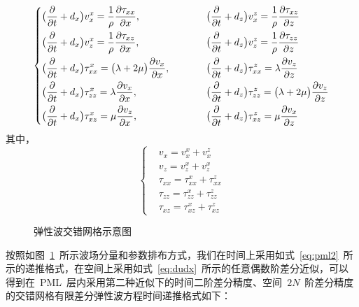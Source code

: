 \documentclass[UTF8]{ctexart}
\begin{document}
\begin{equation}
\left\{ \begin{aligned}
& \big(\frac{\partial}{\partial t}+d_x\big)v_x^x=\frac{1}{\rho}\frac{\partial \tau_{xx}}{\partial x}, & \hspace{10mm} & \big(\frac{\partial}{\partial t}+d_z\big)v_x^z=\frac{1}{\rho}\frac{\partial \tau_{xz}}{\partial z} \\
& \big(\frac{\partial}{\partial t}+d_x\big)v_z^x=\frac{1}{\rho}\frac{\partial \tau_{xz}}{\partial x}, & \hspace{10mm} & \big(\frac{\partial}{\partial t}+d_z\big)v_z^z=\frac{1}{\rho}\frac{\partial \tau_{zz}}{\partial z} \\
& \big(\frac{\partial}{\partial t}+d_x\big)\tau_{xx}^x=\big(\lambda+2\mu\big)\frac{\partial v_x}{\partial x}, & \hspace{10mm} & \big(\frac{\partial}{\partial t}+d_z\big)\tau_{xx}^z=\lambda\frac{\partial v_z}{\partial z} \\
& \big(\frac{\partial}{\partial t}+d_x\big)\tau_{zz}^x=\lambda\frac{\partial v_x}{\partial x}, & \hspace{10mm} & \big(\frac{\partial}{\partial t}+d_z\big)\tau_{zz}^z=\big(\lambda+2\mu\big)\frac{\partial v_z}{\partial z} \\
& \big(\frac{\partial}{\partial t}+d_x\big)\tau_{xz}^x=\mu\frac{\partial v_z}{\partial x}, & \hspace{10mm} & \big(\frac{\partial}{\partial t}+d_z\big)\tau_{xz}^z=\mu\frac{\partial v_x}{\partial z}
\end{aligned} \right.
\end{equation}
其中，
\begin{equation}\label{eq:vt+}
\left\{ \begin{aligned}
& v_x=v_x^x+v_x^z \\
& v_z=v_z^x+v_z^x \\
& \tau_{xx}=\tau_{xx}^x+\tau_{xx}^z \\
& \tau_{zz}=\tau_{zz}^x+\tau_{zz}^z \\
& \tau_{xz}=\tau_{xz}^x+\tau_{xz}^z
\end{aligned} \right.
\end{equation}\par
\begin{figure}[t]
  \centering
  
  \caption{弹性波交错网格示意图}\label{fig:esg}
\end{figure}
按照如图~\ref{fig:esg}~所示波场分量和参数排布方式，我们在时间上采用如式~\eqref{eq:pml2}~所示的递推格式，在空间上采用如式~\eqref{eq:dudx}~所示的任意偶数阶差分近似，可以得到在~PML~层内采用第二种近似下的时间二阶差分精度、空间~$2N$~阶差分精度的交错网格有限差分弹性波方程时间递推格式如下：
\end{document}

